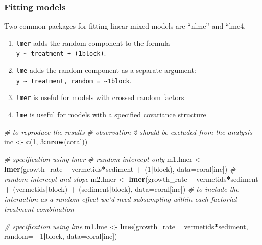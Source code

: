\documentclass[]{book}
\newenvironment{Shaded}{\begin{snugshade}}{\end{snugshade}}
\newcommand{\KeywordTok}[1]{\textcolor[rgb]{0.13,0.29,0.53}{\textbf{#1}}}
\newcommand{\DataTypeTok}[1]{\textcolor[rgb]{0.13,0.29,0.53}{#1}}
\newcommand{\DecValTok}[1]{\textcolor[rgb]{0.00,0.00,0.81}{#1}}
\newcommand{\StringTok}[1]{\textcolor[rgb]{0.31,0.60,0.02}{#1}}
\newcommand{\CommentTok}[1]{\textcolor[rgb]{0.56,0.35,0.01}{\textit{#1}}}
\newcommand{\OperatorTok}[1]{\textcolor[rgb]{0.81,0.36,0.00}{\textbf{#1}}}
\newcommand{\NormalTok}[1]{#1}
\providecommand{\tightlist}{%
  \setlength{\itemsep}{0pt}\setlength{\parskip}{0pt}}
\begin{document}
\subsubsection{Fitting models}\label{fitting-models}

Two common packages for fitting linear mixed models are ``nlme'' and
``lme4.

\begin{enumerate}
\def\labelenumi{\arabic{enumi}.}
\tightlist
\item
  \texttt{lmer} adds the random component to the formula
  \texttt{y\ \textasciitilde{}\ treatment\ +\ (1\textbar{}block)}.
\item
  \texttt{lme} adds the random component as a separate argument:
  \texttt{y\ \textasciitilde{}\ treatment,\ random\ =\ \textasciitilde{}1\textbar{}block}.
\item
  \texttt{lmer} is useful for models with crossed random factors
\item
  \texttt{lme} is useful for models with a specified covariance
  structure
\end{enumerate}

\begin{Shaded}
\begin{Highlighting}[]
\CommentTok{# to reproduce the results}
\CommentTok{# observation 2 should be excluded from the analysis}
\NormalTok{inc <-}\StringTok{ }\KeywordTok{c}\NormalTok{(}\DecValTok{1}\NormalTok{, }\DecValTok{3}\OperatorTok{:}\KeywordTok{nrow}\NormalTok{(coral))}

\CommentTok{# specification using lmer}
\CommentTok{# random intercept only}
\NormalTok{m1.lmer <-}\StringTok{ }\KeywordTok{lmer}\NormalTok{(growth_rate }\OperatorTok{~}\StringTok{ }\NormalTok{vermetids}\OperatorTok{*}\NormalTok{sediment }\OperatorTok{+}\StringTok{ }\NormalTok{(}\DecValTok{1}\OperatorTok{|}\NormalTok{block), }\DataTypeTok{data=}\NormalTok{coral[inc])}
\CommentTok{# random intercept and slope}
\NormalTok{m2.lmer <-}\StringTok{ }\KeywordTok{lmer}\NormalTok{(growth_rate }\OperatorTok{~}\StringTok{ }\NormalTok{vermetids}\OperatorTok{*}\NormalTok{sediment }\OperatorTok{+}\StringTok{ }\NormalTok{(vermetids}\OperatorTok{|}\NormalTok{block) }\OperatorTok{+}\StringTok{ }\NormalTok{(sediment}\OperatorTok{|}\NormalTok{block), }\DataTypeTok{data=}\NormalTok{coral[inc])}
\CommentTok{# to include the interaction as a random effect we'd need subsampling within each factorial treatment combination}

\CommentTok{# specification using lme}
\NormalTok{m1.lme <-}\StringTok{ }\KeywordTok{lme}\NormalTok{(growth_rate }\OperatorTok{~}\StringTok{ }\NormalTok{vermetids}\OperatorTok{*}\NormalTok{sediment, }\DataTypeTok{random=} \OperatorTok{~}\DecValTok{1}\OperatorTok{|}\NormalTok{block, }\DataTypeTok{data=}\NormalTok{coral[inc])}
\end{Highlighting}
\end{Shaded}
\end{document}
